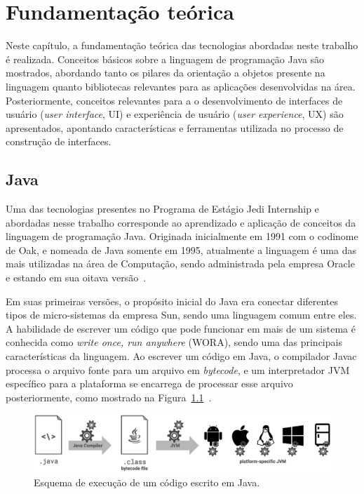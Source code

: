 \chapter{Fundamentação teórica}
\label{cap:fundamentacao-teorica}

Neste capítulo, a fundamentação teórica das tecnologias abordadas neste trabalho é realizada. Conceitos básicos sobre a linguagem de programação Java são mostrados, abordando tanto os pilares da orientação a objetos presente na linguagem quanto bibliotecas relevantes para as aplicações desenvolvidas na área. Posteriormente, conceitos relevantes para a o desenvolvimento de interfaces de usuário (\textit{user interface}, UI) e experiência de usuário (\textit{user experience}, UX) são apresentados, apontando características e ferramentas utilizada no processo de construção de interfaces.

\section{Java}
\label{sec:java}

Uma das tecnologias presentes no Programa de Estágio Jedi Internship e abordadas nesse trabalho corresponde ao aprendizado e aplicação de conceitos da linguagem de programação Java. Originada inicialmente em 1991 com o codinome de Oak, e nomeada de Java somente em 1995, atualmente a linguagem é uma das mais utilizadas na área de Computação, sendo administrada pela empresa Oracle e estando em sua oitava versão~\cite{ocastudyguide-2015}.

Em suas primeiras versões, o propósito inicial do Java era conectar diferentes tipos de micro-sistemas da empresa Sun, sendo uma linguagem comum entre eles. A habilidade de escrever um código que pode funcionar em mais de um sistema é conhecida como \textit{write once, run anywhere} (WORA), sendo uma das principais características da linguagem. Ao escrever um código em Java, o compilador Javac processa o arquivo fonte para um arquivo em \textit{bytecode}, e um interpretador JVM específico para a plataforma se encarrega de processar esse arquivo posteriormente, como mostrado na Figura~\ref{fig:java-fluxo}~\cite{ocastudyguide-2015}.

\begin{figure}[htb!]
  \centering
  \caption{Esquema de execução de um código escrito em Java.}
  \label{fig:java-fluxo}
  \includegraphics[width=\textwidth, keepaspectratio=true]{img/java-fluxo}
\end{figure}

